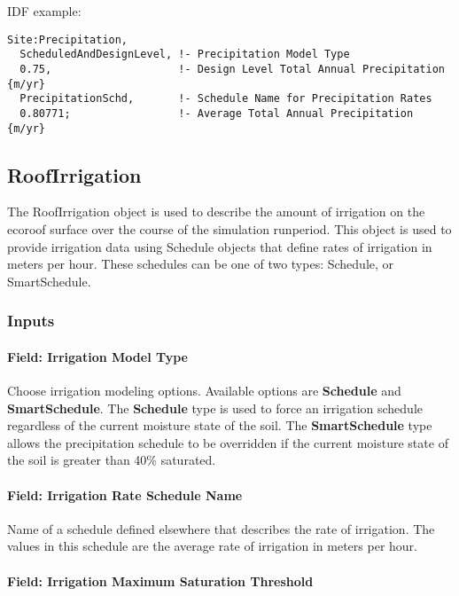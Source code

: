 IDF example:

\begin{lstlisting}
Site:Precipitation,
  ScheduledAndDesignLevel, !- Precipitation Model Type
  0.75,                    !- Design Level Total Annual Precipitation {m/yr}
  PrecipitationSchd,       !- Schedule Name for Precipitation Rates
  0.80771;                 !- Average Total Annual Precipitation {m/yr}
\end{lstlisting}

\subsection{RoofIrrigation}\label{roofirrigation}

The RoofIrrigation object is used to describe the amount of irrigation on the ecoroof surface over the course of the simulation runperiod. This object is used to provide irrigation data using Schedule objects that define rates of irrigation in meters per hour. These schedules can be one of two types: Schedule, or SmartSchedule.

\subsubsection{Inputs}\label{inputs-23-002}

\paragraph{Field: Irrigation Model Type}\label{field-irrigation-model-type}

Choose irrigation modeling options. Available options are \textbf{Schedule} and \textbf{SmartSchedule}. The \textbf{Schedule} type is used to force an irrigation schedule regardless of the current moisture state of the soil. The \textbf{SmartSchedule} type allows the precipitation schedule to be overridden if the current moisture state of the soil is greater than 40\% saturated.

\paragraph{Field: Irrigation Rate Schedule Name}\label{field-irrigation-rate-schedule-name}

Name of a schedule defined elsewhere that describes the rate of irrigation. The values in this schedule are the average rate of irrigation in meters per hour.

\paragraph{Field: Irrigation Maximum Saturation Threshold}\label{field-irrigation-maximum-saturation-threshold}

